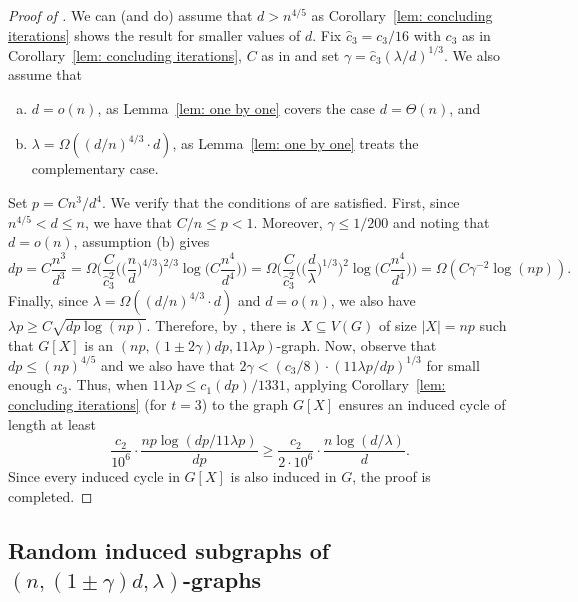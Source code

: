 \documentclass[reqno,a4paper]{amsart}
\theoremstyle{definition}
\begin{document}
\begin{proof}[Proof of ]
We can (and do) assume that $d>n^{4/5}$ as Corollary~\ref{lem: concluding iterations} shows the result for smaller values of $d$. 
Fix $\hat c_3=c_3/16$ with $c_3$ as in Corollary~\ref{lem: concluding iterations}, $C$ as in  and set $\gamma=\hat c_3(\lambda/d)^{1/3}$.
We also assume that 
\begin{enumerate}[(a)]
    \item $d=o(n)$, as Lemma~\ref{lem: one by one} covers the case $d=\Theta(n)$, and
    \item $\lambda=\Omega((d/n)^{4/3}\cdot d)$, as Lemma~\ref{lem: one by one} treats the complementary case.
\end{enumerate}
    
Set $p=C n^3/d^4$. We verify that the conditions of  are satisfied. First, since $n^{4/5}<d\le n$, we have that $C/n\le p< 1$. Moreover, $\gamma\le 1/200$ and noting that $d=o(n)$,
assumption (b) gives
\[dp= C \frac{n^3}{d^3}= \Omega\bigg(\frac{C}{\hat c_3^2} \bigg(\bigg(\frac{n}{d}\bigg)^{4/3}\bigg)^{2/3} \log\bigg(C \frac{n^4}{d^4}\bigg)\bigg)= \Omega\bigg(\frac{C}{\hat c_3^2} \bigg(\bigg(\frac{d}{\lambda}\bigg)^{1/3}\bigg)^{2} \log\bigg(C \frac{n^4}{d^4}\bigg)\bigg)= \Omega(C\gamma^{-2}\log(np)).\]
Finally, since $\lambda=\Omega((d/n)^{4/3}\cdot d)$ and $d=o(n)$, we also have $\lambda p\ge C\sqrt{dp\log (np)}$. 
Therefore, by , there is $X\subseteq V(G)$ of size $|X|=np$ such that $G[X]$ is an $(np,(1\pm 2\gamma)dp, 11\lambda p)$-graph. Now, observe that $dp\le (np)^{4/5}$ and we also have that $2\gamma<(c_3/8)\cdot(11\lambda p/dp)^{1/3}$ for small enough $c_3$. 
Thus, when $11\lambda p\le c_1 (dp)/1331$, applying Corollary~\ref{lem: concluding iterations} (for $t=3$) to the graph $G[X]$ ensures an induced cycle of length at least
    \[
        \frac{c_2}{10^6}\cdot\frac{np\log(dp/11\lambda p)}{dp}\ge \frac{c_2}{2\cdot 10^6}\cdot \frac{n\log(d/\lambda)}{d}.
    \]
Since every induced cycle in $G[X]$ is also induced in $G$, the proof is completed.
\end{proof}

\subsection{\texorpdfstring{Random induced subgraphs of $(n,(1\pm \gamma)d,\lambda)$-graphs}{Random Induced Subgraphs of approximately regular pseudorandom graphs}}\label{s: generalisation of FHMV}
\end{document}
